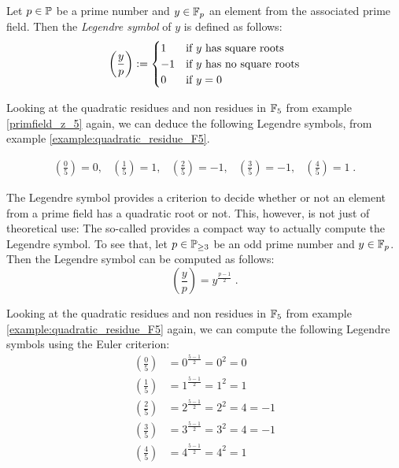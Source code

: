 Let $ p \in \mathbb{P} $ be a prime number and $ y \in \mathbb{F}_p $ an element from the associated prime field. Then the \textit{Legendre symbol} of $ y $ is defined as follows:
\begin{equation}
\label{eq: Legendre-symbol}
\left (\frac{y}{p} \right): =
\begin{cases}
1 & \text{if $ y $ has square roots} \\
-1 & \text{if $ y $ has no square roots} \\
0 & \text{if $ y = 0 $}
\end{cases}
\end{equation}
\begin{example}
Looking at the quadratic residues and non residues in $\mathbb{F}_5$ from example \ref{primfield_z_5} again, we can deduce the following Legendre symbols, from example \ref{example:quadratic_residue_F5}.

$$
\begin{array}{ccccc}
\left (\frac{0}{5} \right) = 0, &
\left (\frac{1}{5} \right) = 1, &
\left (\frac{2}{5} \right) = -1, &
\left (\frac{3}{5} \right) = -1, &
\left (\frac{4}{5} \right) = 1 \;.
\end{array}
$$
\end{example}
The Legendre symbol provides a criterion to decide whether or not an element from a prime field has a quadratic root or not. This, however, is not just of theoretical use: The  so-called  provides a compact way to actually compute the Legendre symbol. To see that, let $ p \in \mathbb{P}_{\geq 3} $ be an odd prime number and $ y \in \mathbb{F}_p $. Then the Legendre symbol can be computed as follows:
\begin{equation}
\label{eq: Euler_criterion}
\left (\frac{y}{p} \right) = y^{\frac{p-1}{2}} \;.
\end{equation}
\begin{example}
Looking at the quadratic residues and non residues in $\mathbb{F}_5$ from example \ref{example:quadratic_residue_F5} again, we can compute the following Legendre symbols using the Euler criterion:
\begin{align*}
\left (\frac{0}{5} \right) &= 0^{\frac{5-1}{2}}= 0^2=0\\
\left (\frac{1}{5} \right) &= 1^{\frac{5-1}{2}}= 1^2=1\\
\left (\frac{2}{5} \right) &= 2^{\frac{5-1}{2}}= 2^2=4 = -1\\
\left (\frac{3}{5} \right) &= 3^{\frac{5-1}{2}}= 3^2=4 =-1\\
\left (\frac{4}{5} \right) &= 4^{\frac{5-1}{2}}= 4^2=1
\end{align*}
\end{example}
